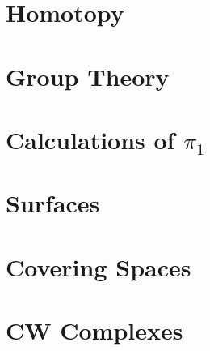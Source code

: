 \documentclass[12pt]{book}
\theoremstyle{definition}
\begin{document}
\chapter{Homotopy}

\chapter{Group Theory}

\chapter{Calculations of \( \pi_{1} \)}

\chapter{Surfaces}

\chapter{Covering Spaces}

\chapter{CW Complexes}
\end{document}
